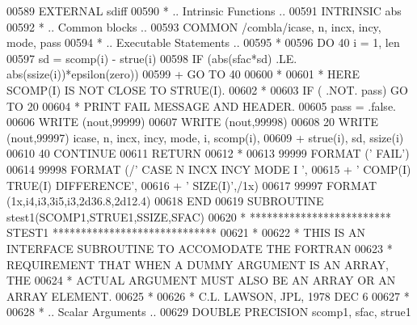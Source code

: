 \begin{DoxyCode}
00589       \textcolor{keywordtype}{EXTERNAL}         sdiff
00590 \textcolor{comment}{*     .. Intrinsic Functions ..}
00591       \textcolor{keywordtype}{INTRINSIC}        abs
00592 \textcolor{comment}{*     .. Common blocks ..}
00593       \textcolor{keyword}{COMMON}           /combla/icase, n, incx, incy, mode, pass
00594 \textcolor{comment}{*     .. Executable Statements ..}
00595 \textcolor{comment}{*}
00596       \textcolor{keywordflow}{DO} 40 i = 1, len
00597          sd = scomp(i) - strue(i)
00598          \textcolor{keywordflow}{IF} (abs(sfac*sd) .LE. abs(ssize(i))*epsilon(zero))
00599      +       \textcolor{keywordflow}{GO TO} 40
00600 \textcolor{comment}{*}
00601 \textcolor{comment}{*                             HERE    SCOMP(I) IS NOT CLOSE TO STRUE(I).}
00602 \textcolor{comment}{*}
00603          \textcolor{keywordflow}{IF} ( .NOT. pass) \textcolor{keywordflow}{GO TO} 20
00604 \textcolor{comment}{*                             PRINT FAIL MESSAGE AND HEADER.}
00605          pass = .false.
00606          \textcolor{keyword}{WRITE} (nout,99999)
00607          \textcolor{keyword}{WRITE} (nout,99998)
00608    20    \textcolor{keyword}{WRITE} (nout,99997) icase, n, incx, incy, mode, i, scomp(i),
00609      +     strue(i), sd, ssize(i)
00610    40 \textcolor{keywordflow}{CONTINUE}
00611       \textcolor{keywordflow}{RETURN}
00612 \textcolor{comment}{*}
00613 99999 \textcolor{keyword}{FORMAT} (\textcolor{stringliteral}{'                                       FAIL'})
00614 99998 \textcolor{keyword}{FORMAT} (/\textcolor{stringliteral}{' CASE  N INCX INCY MODE  I                            '},
00615      +       \textcolor{stringliteral}{' COMP(I)                             TRUE(I)  DIFFERENCE'},
00616      +       \textcolor{stringliteral}{'     SIZE(I)'},/1x)
00617 99997 \textcolor{keyword}{FORMAT} (1x,i4,i3,3i5,i3,2d36.8,2d12.4)
00618 \textcolor{keyword}{      END}
00619 \textcolor{keyword}{      SUBROUTINE }stest1(SCOMP1,STRUE1,SSIZE,SFAC)
00620 \textcolor{comment}{*     ************************* STEST1 *****************************}
00621 \textcolor{comment}{*}
00622 \textcolor{comment}{*     THIS IS AN INTERFACE SUBROUTINE TO ACCOMODATE THE FORTRAN}
00623 \textcolor{comment}{*     REQUIREMENT THAT WHEN A DUMMY ARGUMENT IS AN ARRAY, THE}
00624 \textcolor{comment}{*     ACTUAL ARGUMENT MUST ALSO BE AN ARRAY OR AN ARRAY ELEMENT.}
00625 \textcolor{comment}{*}
00626 \textcolor{comment}{*     C.L. LAWSON, JPL, 1978 DEC 6}
00627 \textcolor{comment}{*}
00628 \textcolor{comment}{*     .. Scalar Arguments ..}
00629       \textcolor{keywordtype}{DOUBLE PRECISION}  scomp1, sfac, strue1

\end{DoxyCode}
